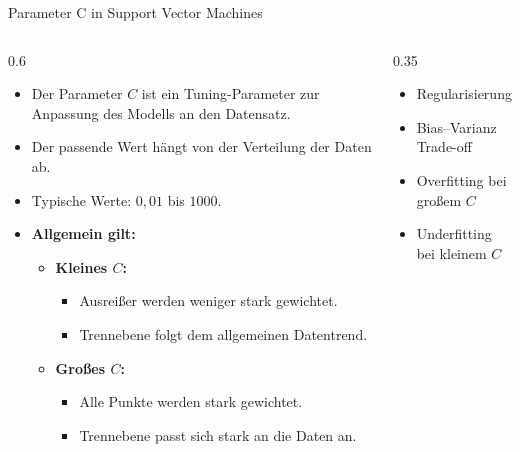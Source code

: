 \begin{frame}{Parameter C in Support Vector Machines}
\begin{columns}

\begin{column}{0.6\textwidth}
\begin{itemize}
  \item Der Parameter $C$ ist ein Tuning-Parameter zur Anpassung des Modells an den Datensatz.
  \item Der passende Wert hängt von der Verteilung der Daten ab.
  \item Typische Werte: $0{,}01$ bis $1000$.
  \item \textbf{Allgemein gilt:}
  \begin{itemize}
    \item \textbf{Kleines $C$:}
    \begin{itemize}
      \item Ausreißer werden weniger stark gewichtet.
      \item Trennebene folgt dem allgemeinen Datentrend.
    \end{itemize}
    \item \textbf{Großes $C$:}
    \begin{itemize}
      \item Alle Punkte werden stark gewichtet.
      \item Trennebene passt sich stark an die Daten an.
    \end{itemize}
  \end{itemize}
\end{itemize}
\end{column}

\begin{column}{0.35\textwidth}
\begin{itemize}
  \item Regularisierung
  \item Bias--Varianz Trade-off
  \item Overfitting bei großem $C$
  \item Underfitting bei kleinem $C$
\end{itemize}
\end{column}

\end{columns}
\end{frame}

